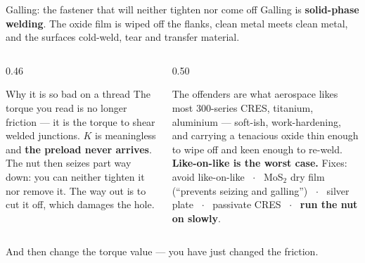 \documentclass[aspectratio=169,10pt]{beamer}
\begin{document}
\begin{frame}{Galling: the fastener that will neither tighten nor come off}
Galling is \textbf{solid-phase welding}. The oxide film is wiped off the flanks, clean metal meets
clean metal, and the surfaces cold-weld, tear and transfer material.
\vfill
\begin{columns}[T]
\begin{column}{0.46\textwidth}
\begin{alertblock}{Why it is so bad on a thread}
The torque you read is no longer friction --- it is the torque to shear welded junctions. $K$ is
meaningless and \textbf{the preload never arrives}.
\vspace{2pt}
The nut then seizes part way down: you can neither tighten it nor remove it. The way out is to cut
it off, which damages the hole.
\end{alertblock}
\end{column}
\begin{column}{0.50\textwidth}
\begin{block}{The offenders are what aerospace likes most}
300-series CRES, titanium, aluminium --- soft-ish, work-hardening, and carrying a tenacious oxide
thin enough to wipe off and keen enough to re-weld. \textbf{Like-on-like is the worst case.}
\vspace{2pt}
{\footnotesize Fixes: avoid like-on-like \ $\cdot$ \ MoS$_2$ dry film (``prevents seizing and
galling'') \ $\cdot$ \ silver plate \ $\cdot$ \ passivate CRES \ $\cdot$ \ \textbf{run the nut on
slowly}.}
\end{block}
\end{column}
\end{columns}
\vfill
\centering
And then \alert{change the torque value} --- you have just changed the friction.
\end{frame}
\end{document}
